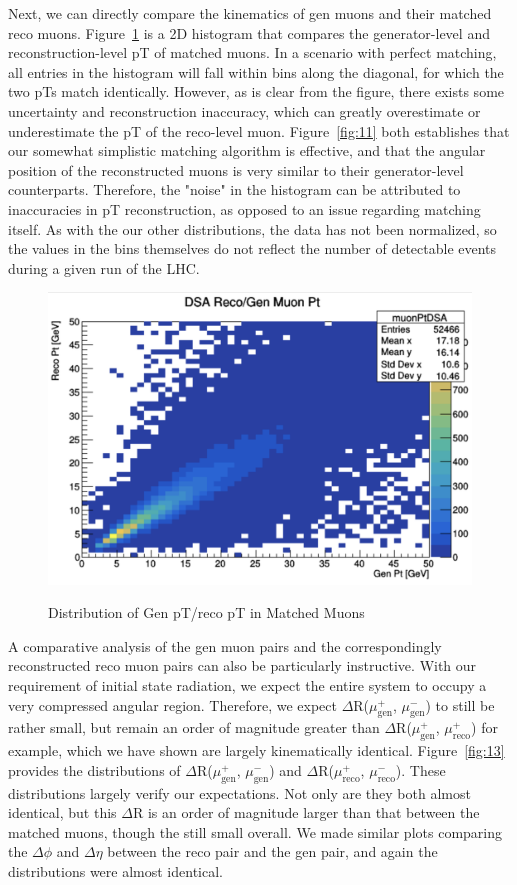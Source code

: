 \documentclass{article}
\begin{document}
Next, we can directly compare the kinematics of gen muons and their matched reco muons. Figure~\ref{fig:12} is a 2D histogram that compares the generator-level and reconstruction-level pT of matched muons. In a scenario with perfect matching, all entries in the histogram will fall within bins along the diagonal, for which the two pTs match identically. However, as is clear from the figure, there exists some uncertainty and reconstruction inaccuracy, which can greatly overestimate or underestimate the pT of the reco-level muon. Figure~\ref{fig:11} both establishes that our somewhat simplistic matching algorithm is effective, and that the angular position of the reconstructed muons is very similar to their generator-level counterparts. Therefore, the "noise" in the histogram can be attributed to inaccuracies in pT reconstruction, as opposed to an issue regarding matching itself. As with the our other distributions, the data has not been normalized, so the values in the bins themselves do not reflect the number of detectable events during a given run of the LHC.
\begin{figure}[H]
    \centering
    \caption{Distribution of Gen pT/reco pT in Matched Muons} 
    \includegraphics[width=12cm]{pT2D.png}
    \label{fig:12}
\end{figure}
\par
A comparative analysis of the gen muon pairs and the correspondingly reconstructed reco muon pairs can also be particularly instructive. With our requirement of initial state radiation, we expect the entire system to occupy a very compressed angular region. Therefore, we expect $\Delta$R($\mu_{\text{gen}}^{+}$, $\mu_{\text{gen}}^{-}$) to still be rather small, but remain an order of magnitude greater than $\Delta$R($\mu_{\text{gen}}^{+}$, $\mu_{\text{reco}}^{+}$) for example, which we have shown are largely kinematically identical. Figure~\ref{fig:13} provides the distributions of $\Delta$R($\mu_{\text{gen}}^{+}$, $\mu_{\text{gen}}^{-}$) and $\Delta$R($\mu_{\text{reco}}^{+}$, $\mu_{\text{reco}}^{-}$). These distributions largely verify our expectations. Not only are they both almost identical, but this $\Delta$R is an order of magnitude larger than that between the matched muons, though the still small overall. We made similar plots comparing the $\Delta$$\phi$ and $\Delta$$\eta$ between the reco pair and the gen pair, and again the distributions were almost identical.
\end{document}
